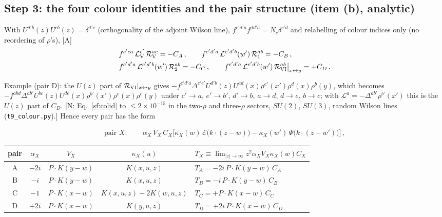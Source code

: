\subsection{Step 3: the four colour identities and the pair structure (item (b), analytic)}
\noindent With $U^{d'b}(z)U^{cb}(z)=\delta^{d'c}$ (orthogonality of the adjoint Wilson line), $f^{c'd'a}f^{dd'a}=N_{c}\delta^{c'd}$ and relabelling of colour indices only (no reordering of $\rho$'s), [A]
\begin{align}
&f^{c'ca}\,\mathcal{L}_{\rm V}^{c'}\,\mathcal{R}_{\rm V}^{ac}=-C_{A}\,,\qquad f^{c'd'a}\,\mathcal{L}^{c'd'b}(w')\,\mathcal{R}_{1}^{ab}=-C_{B}\,,\notag\\ &f^{c'd'a}\,\mathcal{L}^{c'd'b}(w')\,\mathcal{R}_{2}^{ab}=-C_{C}\,,\qquad f^{c'd'a}\,\mathcal{L}^{c'd'b}(w')\,\mathcal{R}_{\rm VI}^{ab}\big|_{x\leftrightarrow y}=+C_{D}\,.\label{sf:colid}
\end{align}
{\sloppy Example (pair D): the $U(z)$ part of $\mathcal{R}_{\rm VI}|_{x\leftrightarrow y}$ gives $-f^{c'd'a}\Delta^{c'e'}U^{d'b}(z)U^{ad}(x)\rho^{e'}(x')\rho^{d}(x)\rho^{b}(y)$, which becomes $-f^{abd}\Delta^{ab'}U^{bc}(z)U^{de}(x)\rho^{b'}(x')\rho^{e}(x)\rho^{c}(y)$ under $c'\to a$, $e'\to b'$, $d'\to b$, $a\to d$, $d\to e$, $b\to c$; with $\mathcal{L}^{a}=-\Delta^{ab'}\rho^{b'}(x')$ this is the $U(z)$ part of $C_{D}$. [N: Eq.~\eqref{sf:colid} to $\le2\times10^{-15}$ in the two-$\rho$ and three-$\rho$ sectors, $SU(2)$, $SU(3)$, random Wilson lines (\texttt{t9\_colour.py}).] Hence every pair has the form\par}
\begin{align}
\text{pair }X:\qquad \alpha_{X}\,V_{X}\,C_{X}\Big[\kappa_{X}(w)\,\mathcal{E}\big(k\cdot(z-w)\big)-\kappa_{X}(w')\,\Psi\big(k\cdot(z-w')\big)\Big]\,,\label{sf:pair}
\end{align}
\begin{center}
\renewcommand{\arraystretch}{1.3}
\begin{tabular}{|c|c|c|c|l|}\hline
pair & $\alpha_{X}$ & $V_{X}$ & $\kappa_{X}(u)$ & $T_{X}\equiv\lim_{|z|\to\infty} z^{2}\alpha_{X}V_{X}\kappa_{X}(w)C_{X}$\\\hline
A & $-2i$ & $P\cdot K(y-w)$ & $K(x,u,z)$ & $T_{A}=-2i\,P\!\cdot\!K(y-w)\,C_{A}$\\
B & $-i$ & $P\cdot K(y-w)$ & $K(x,u,z)$ & $T_{B}=-i\,P\!\cdot\!K(y-w)\,C_{B}$\\
C & $-1$ & $P\cdot K(x-w)$ & $K(x,u,z)-2K(w,u,z)$ & $T_{C}=+P\!\cdot\!K(x-w)\,C_{C}$\\
D & $+2i$ & $P\cdot K(x-w)$ & $K(y,u,z)$ & $T_{D}=+2i\,P\!\cdot\!K(x-w)\,C_{D}$\\\hline
\end{tabular}
\end{center}
